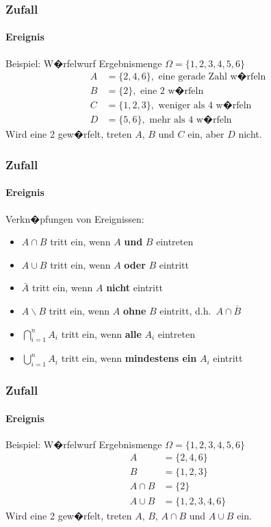 \documentclass[12pt,show notes]{beamer}
\begin{document}
\begin{frame}
\frametitle{Zufall}
\framesubtitle{Ereignis}
\begin{exampleblock}{Beispiel: W�rfelwurf}
Ergebnismenge $\Omega =\{1,2,3,4,5,6\}$
\begin{align*}
A &= \{2,4,6\},\text{ eine gerade Zahl w�rfeln}\\
B &= \{2\},\text{ eine 2 w�rfeln} \\
C &= \{1,2,3\},\text{ weniger als 4 w�rfeln} \\
D &= \{5,6\},\text{ mehr als 4 w�rfeln}
\end{align*}
Wird eine 2 gew�rfelt, treten $A$, $B$ und $C$ ein, aber $D$ nicht.
\end{exampleblock}
\end{frame}

\begin{frame}
\frametitle{Zufall}
\framesubtitle{Ereignis}
Verkn�pfungen von Ereignissen:\medskip
\begin{itemize}
\item $A\cap B$ tritt ein, wenn $A$ \textbf{und} $B$ eintreten
\item $A\cup B$ tritt ein, wenn $A$ \textbf{oder} $B$ eintritt
\item $\bar{A}$ tritt ein, wenn $A$ \textbf{nicht} eintritt
\item $A\backslash B$ tritt ein, wenn $A$ \textbf{ohne} $B$ eintritt, d.h.\ $A\cap\bar B$
\item $\bigcap_{i=1}^{n}A_{i}$ tritt ein, wenn \textbf{alle} $A_{i}$ eintreten
\item $\bigcup_{i=1}^{n}A_{i}$ tritt ein, wenn \textbf{mindestens ein} $A_{i}$ eintritt
\end{itemize}
\end{frame}

\begin{frame}
\frametitle{Zufall}
\framesubtitle{Ereignis}
\begin{exampleblock}{Beispiel: W�rfelwurf}
Ergebnismenge $\Omega =\{1,2,3,4,5,6\}$
\begin{align*}
A &= \{2,4,6\}\\
B &= \{1,2,3\}\\
A\cap B &=\{2\}\\
A\cup B&=\{1,2,3,4,6\}
\end{align*}
Wird eine 2 gew�rfelt, treten $A$, $B$, $A\cap B$ und $A\cup B$ ein.
\end{exampleblock}
\end{frame}
\end{document}
